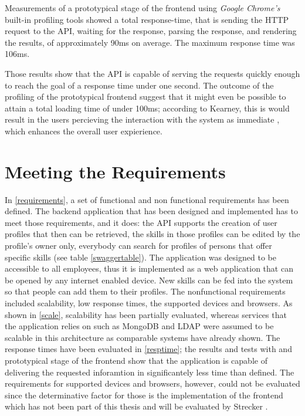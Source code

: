 Measurements of a prototypical stage of the frontend using \textit{Google Chrome's} built-in profiling tools showed a total response-time, that is sending the HTTP request to the API, waiting for the response, parsing the response, and rendering the results, of approximately 90ms on average. The maximum response time was 106ms.

Those results show that the API is capable of serving the requests quickly enough to reach the goal of a response time under one second. The outcome of the profiling of the prototypical frontend suggest that it might even be possible to attain a total loading time of under 100ms; according to Kearney, this is would result in the users percieving the interaction with the system as immediate \cite{responsetimes}, which enhances the overall user expierience.

\section{Meeting the Requirements}
In \ref{requirements}, a set of functional and non functional requirements has been defined. The backend application that has been designed and implemented has to meet those requirements, and it does: the API supports the creation of user profiles that then can be retrieved, the skills in those profiles can be edited by the profile's owner only, everybody can search for profiles of persons that offer specific skills (see table \ref{swaggertable}). The application was designed to be accessible to all employees, thus it is implemented as a web application that can be opened by any internet enabled device. New skills can be fed into the system so that people can add them to their profiles. \newline
The nonfunctional requirements included scalability, low response times, the supported devices and browsers.
As shown in \ref{scale}, scalability has been partially evaluated, whereas services that the application relies on such as MongoDB and LDAP were assumed to be scalable in this architecture as comparable systems have already shown. The response times have been evaluated in \ref{resptime}; the results and tests with and prototypical stage of the frontend show that the application is capable of delivering the requested inforamtion in significantely less time than defined.
The requirements for supported devices and browsers, however, could not be evaluated since the determinative factor for those is the implementation of the frontend which has not been part of this thesis and will be evaluated by Strecker \cite{strecker}.
